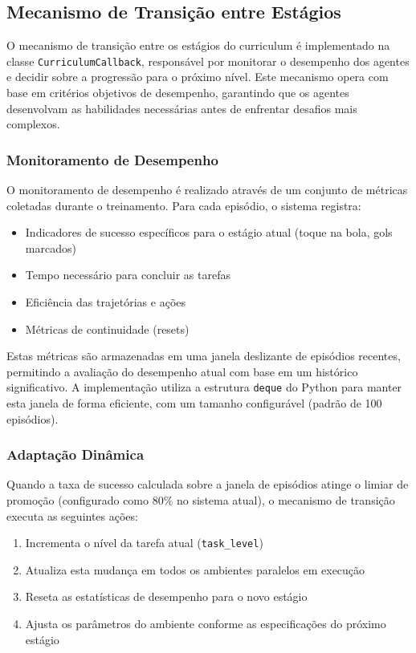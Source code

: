 \subsection{Mecanismo de Transição entre Estágios}
\label{subsec:mecanismo_transicao}

O mecanismo de transição entre os estágios do curriculum é implementado na classe \texttt{CurriculumCallback}, responsável por monitorar o desempenho dos agentes e decidir sobre a progressão para o próximo nível. Este mecanismo opera com base em critérios objetivos de desempenho, garantindo que os agentes desenvolvam as habilidades necessárias antes de enfrentar desafios mais complexos.

\subsubsection{Monitoramento de Desempenho}

O monitoramento de desempenho é realizado através de um conjunto de métricas coletadas durante o treinamento. Para cada episódio, o sistema registra:

\begin{itemize}
    \item Indicadores de sucesso específicos para o estágio atual (toque na bola, gols marcados)
    \item Tempo necessário para concluir as tarefas
    \item Eficiência das trajetórias e ações
    \item Métricas de continuidade (resets)
\end{itemize}

Estas métricas são armazenadas em uma janela deslizante de episódios recentes, permitindo a avaliação do desempenho atual com base em um histórico significativo. A implementação utiliza a estrutura \texttt{deque} do Python para manter esta janela de forma eficiente, com um tamanho configurável (padrão de 100 episódios).

\subsubsection{Adaptação Dinâmica}

Quando a taxa de sucesso calculada sobre a janela de episódios atinge o limiar de promoção (configurado como 80\% no sistema atual), o mecanismo de transição executa as seguintes ações:

\begin{enumerate}
    \item Incrementa o nível da tarefa atual (\texttt{task\_level})
    \item Atualiza esta mudança em todos os ambientes paralelos em execução
    \item Reseta as estatísticas de desempenho para o novo estágio
    \item Ajusta os parâmetros do ambiente conforme as especificações do próximo estágio
\end{enumerate}

